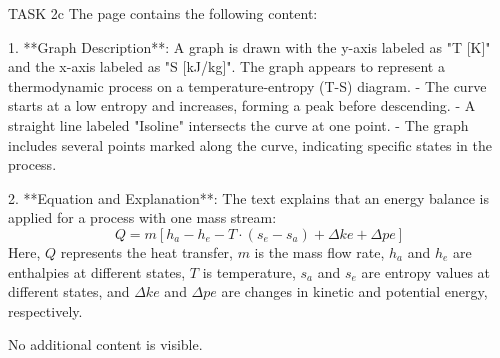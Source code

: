 TASK 2c  
The page contains the following content:

1. **Graph Description**:  
   A graph is drawn with the y-axis labeled as "T [K]" and the x-axis labeled as "S [kJ/kg]". The graph appears to represent a thermodynamic process on a temperature-entropy (T-S) diagram.  
   - The curve starts at a low entropy and increases, forming a peak before descending.  
   - A straight line labeled "Isoline" intersects the curve at one point.  
   - The graph includes several points marked along the curve, indicating specific states in the process.  

2. **Equation and Explanation**:  
   The text explains that an energy balance is applied for a process with one mass stream:  
   \[
   Q = m \left[ h_a - h_e - T \cdot (s_e - s_a) + \Delta ke + \Delta pe \right]
   \]  
   Here, \( Q \) represents the heat transfer, \( m \) is the mass flow rate, \( h_a \) and \( h_e \) are enthalpies at different states, \( T \) is temperature, \( s_a \) and \( s_e \) are entropy values at different states, and \( \Delta ke \) and \( \Delta pe \) are changes in kinetic and potential energy, respectively.  

No additional content is visible.